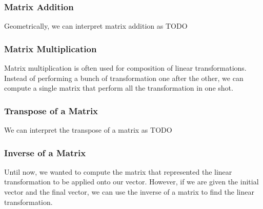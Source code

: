 \documentclass{article}
\begin{document}
\subsubsection{Matrix Addition}

Geometrically, we can interpret matrix addition as TODO

\begin{theorem}
\end{theorem}

\subsubsection{Matrix Multiplication}

Matrix multiplication is often used for composition of linear transformations.
Instead of performing a bunch of transformation one after the other, we can
compute a single matrix that perform all the transformation in one shot.

\begin{definition}
\end{definition}

\begin{theorem}
\end{theorem}

\subsubsection{Transpose of a Matrix}

We can interpret the transpose of a matrix as TODO

\begin{definition}
\end{definition}

\begin{theorem}
\end{theorem}

\subsubsection{Inverse of a Matrix}

Until now, we wanted to compute the matrix that represented the linear transformation
to be applied onto our vector. However, if we are given the initial vector and
the final vector, we can use the inverse of a matrix to find the linear transformation.
\end{document}
